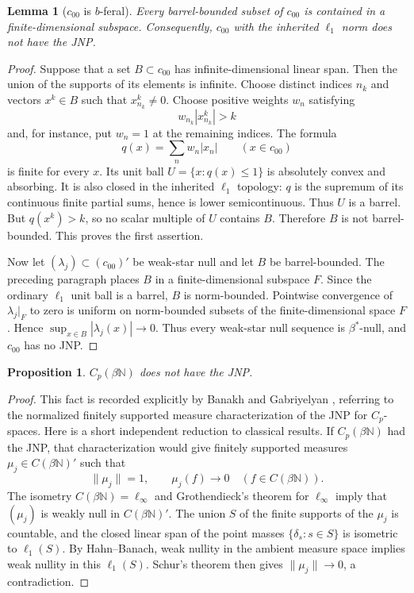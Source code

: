 \documentclass[11pt]{article}
\newtheorem{lemma}{Lemma}
\newtheorem{proposition}{Proposition}
\newcommand{\N}{\mathbb N}
\begin{document}
\begin{lemma}[$c_{00}$ is $b$-feral]\label{lem:feral}
Every barrel-bounded subset of $c_{00}$ is contained in a finite-dimensional
subspace.  Consequently, $c_{00}$ with the inherited $\ell_1$ norm does not
have the JNP.
\end{lemma}

\begin{proof}
Suppose that a set $B\subset c_{00}$ has infinite-dimensional linear span.
Then the union of the supports of its elements is infinite.  Choose distinct
indices $n_k$ and vectors $x^k\in B$ such that $x^k_{n_k}\neq0$.
Choose positive weights $w_n$ satisfying
\[
  w_{n_k}|x^k_{n_k}|>k
\]
and, for instance, put $w_n=1$ at the remaining indices.  The formula
\[
  q(x)=\sum_n w_n|x_n| \qquad (x\in c_{00})
\]
is finite for every $x$.  Its unit ball
$U=\{x:q(x)\leq1\}$ is absolutely convex and absorbing.  It is also closed
in the inherited $\ell_1$ topology: $q$ is the supremum of its continuous
finite partial sums, hence is lower semicontinuous.  Thus $U$ is a barrel.
But $q(x^k)>k$, so no scalar multiple of $U$ contains $B$.  Therefore $B$
is not barrel-bounded.  This proves the first assertion.

Now let $(\lambda_j)\subset(c_{00})'$ be weak-star null and let $B$ be
barrel-bounded.  The preceding paragraph places $B$ in a finite-dimensional
subspace $F$.  Since the ordinary $\ell_1$ unit ball is a barrel, $B$ is
norm-bounded.  Pointwise convergence of $\lambda_j|_F$ to zero is uniform on
norm-bounded subsets of the finite-dimensional space $F$.  Hence
$\sup_{x\in B}|\lambda_j(x)|\to0$.  Thus every weak-star null sequence is
$\beta^*$-null, and $c_{00}$ has no JNP.
\end{proof}

\begin{proposition}\label{prop:beta}
$C_p(\beta\N)$ does not have the JNP.
\end{proposition}

\begin{proof}
This fact is recorded explicitly by Banakh and Gabriyelyan
\cite[Introduction]{BG}, referring to the normalized finitely supported
measure characterization of the JNP for $C_p$-spaces.  Here is a short
independent reduction to classical results.  If $C_p(\beta\N)$ had the JNP,
that characterization would give finitely supported measures
$\mu_j\in C(\beta\N)'$ such that
\[
  \|\mu_j\|=1,\qquad \mu_j(f)\longrightarrow0
  \quad(f\in C(\beta\N)).
\]
The isometry $C(\beta\N)=\ell_\infty$ and Grothendieck's theorem for
$\ell_\infty$ \cite{Grothendieck} imply that $(\mu_j)$ is weakly null in
$C(\beta\N)'$.  The union $S$ of the finite supports of the $\mu_j$ is
countable, and the closed linear span of the point masses $\{\delta_s:s\in
S\}$ is isometric to $\ell_1(S)$.  By Hahn--Banach, weak nullity in the
ambient measure space implies weak nullity in this $\ell_1(S)$.  Schur's
theorem \cite{Schur} then gives $\|\mu_j\|\to0$, a contradiction.
\end{proof}
\end{document}
